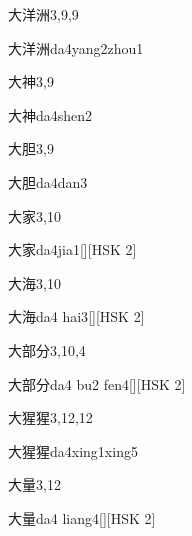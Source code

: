 \begin{entry}{大洋洲}{3,9,9}
  \begin{phonetics}{大洋洲}{da4yang2zhou1}
  \end{phonetics}
\end{entry}

\begin{entry}{大神}{3,9}
  \begin{phonetics}{大神}{da4shen2}
  \end{phonetics}
\end{entry}

\begin{entry}{大胆}{3,9}
  \begin{phonetics}{大胆}{da4dan3}
  \end{phonetics}
\end{entry}

\begin{entry}{大家}{3,10}
  \begin{phonetics}{大家}{da4jia1}[][HSK 2]
  \end{phonetics}
\end{entry}

\begin{entry}{大海}{3,10}
  \begin{phonetics}{大海}{da4 hai3}[][HSK 2]
  \end{phonetics}
\end{entry}

\begin{entry}{大部分}{3,10,4}
  \begin{phonetics}{大部分}{da4 bu2 fen4}[][HSK 2]
  \end{phonetics}
\end{entry}

\begin{entry}{大猩猩}{3,12,12}
  \begin{phonetics}{大猩猩}{da4xing1xing5}
  \end{phonetics}
\end{entry}

\begin{entry}{大量}{3,12}
  \begin{phonetics}{大量}{da4 liang4}[][HSK 2]
  \end{phonetics}
\end{entry}


